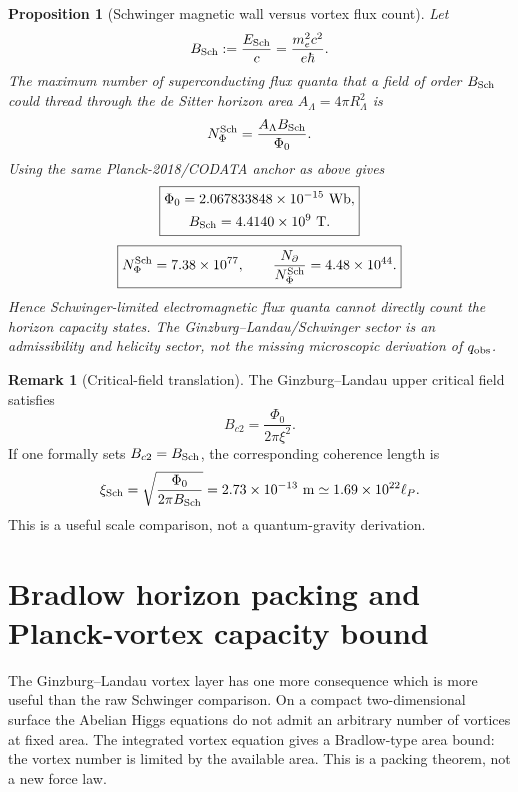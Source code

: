 \documentclass[aps,prd,reprint,nofootinbib,superscriptaddress,floatfix]{revtex4-2}
\numberwithin{equation}{section}
\theoremstyle{definition}
\newtheorem{remark}{Remark}[section]
\theoremstyle{plain}
\newtheorem{proposition}{Proposition}[section]
\begin{document}
\begin{proposition}[Schwinger magnetic wall versus vortex flux count]
\label{prop:schwinger-gl-wall}
Let
\[
B_{\rm Sch}:=\frac{E_{\rm Sch}}{c}
=
\frac{m_e^2c^2}{e\hbar}.
\]
The maximum number of superconducting flux quanta that a field of order
\(B_{\rm Sch}\) could thread through the de Sitter horizon area
\(A_\Lambda=4\pi R_\Lambda^2\) is
\begin{equation}
N_\Phi^{\rm Sch}
=
\frac{A_\Lambda B_{\rm Sch}}{\Phi_0}.
\end{equation}
Using the same Planck-2018/CODATA anchor as above gives
\begin{equation}
\boxed{
\begin{gathered}
\Phi_0=2.067833848\times10^{-15}\ {\rm Wb},
\\
B_{\rm Sch}=4.4140\times10^{9}\ {\rm T}.
\end{gathered}}
\end{equation}
\begin{equation}
\boxed{
N_\Phi^{\rm Sch}=7.38\times10^{77},
\qquad
\frac{N_\partial}{N_\Phi^{\rm Sch}}
=4.48\times10^{44}.
}
\end{equation}
Hence Schwinger-limited electromagnetic flux quanta cannot directly count
the horizon capacity states.  The Ginzburg--Landau/Schwinger sector is an
admissibility and helicity sector, not the missing microscopic derivation of
\(q_{\rm obs}\).
\end{proposition}

\begin{remark}[Critical-field translation]
The Ginzburg--Landau upper critical field satisfies
\[
B_{c2}=\frac{\Phi_0}{2\pi\xi^2}.
\]
If one formally sets \(B_{c2}=B_{\rm Sch}\), the corresponding coherence
length is
\[
\xi_{\rm Sch}
=
\sqrt{\frac{\Phi_0}{2\pi B_{\rm Sch}}}
=
2.73\times10^{-13}\ {\rm m}
\simeq1.69\times10^{22}\ell_P.
\]
This is a useful scale comparison, not a quantum-gravity derivation.
\end{remark}



\section{Bradlow horizon packing and Planck-vortex capacity bound}
\label{sec:bradlow-packing}
\label{sec:bradlow-capacity}

The Ginzburg--Landau vortex layer has one more consequence which is more
useful than the raw Schwinger comparison.  On a compact two-dimensional
surface the Abelian Higgs equations do not admit an arbitrary number of
vortices at fixed area.  The integrated vortex equation gives a Bradlow-type
area bound: the vortex number is limited by the available area.  This is a
packing theorem, not a new force law.
\end{document}
